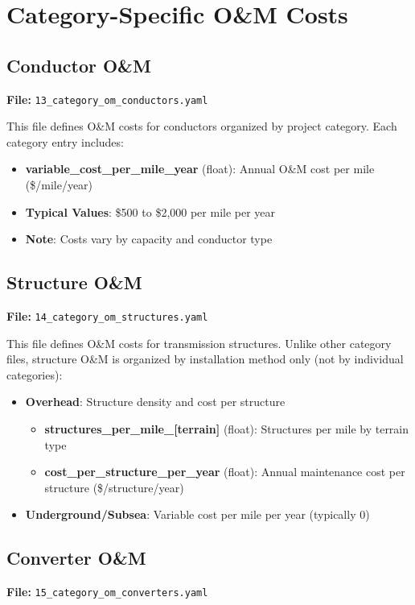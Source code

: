 \documentclass[ctcc_full_documentation.tex]{subfiles}
\begin{document}
\section{Category-Specific O\&M Costs}
\label{sec:category_om}

\subsection{Conductor O\&M}
\textbf{File:} \texttt{13\_category\_om\_conductors.yaml}

This file defines O\&M costs for conductors organized by project category. Each category entry includes:
\begin{itemize}
    \item \textbf{variable\_cost\_per\_mile\_year} (float): Annual O\&M cost per mile (\$/mile/year)
    \item \textbf{Typical Values}: \$500 to \$2,000 per mile per year
    \item \textbf{Note}: Costs vary by capacity and conductor type
\end{itemize}

\subsection{Structure O\&M}
\textbf{File:} \texttt{14\_category\_om\_structures.yaml}

This file defines O\&M costs for transmission structures. Unlike other category files, structure O\&M is organized by installation method only (not by individual categories):
\begin{itemize}
    \item \textbf{Overhead}: Structure density and cost per structure
    \begin{itemize}
        \item \textbf{structures\_per\_mile\_[terrain]} (float): Structures per mile by terrain type
        \item \textbf{cost\_per\_structure\_per\_year} (float): Annual maintenance cost per structure (\$/structure/year)
    \end{itemize}
    \item \textbf{Underground/Subsea}: Variable cost per mile per year (typically 0)
\end{itemize}

\subsection{Converter O\&M}
\textbf{File:} \texttt{15\_category\_om\_converters.yaml}
\end{document}
